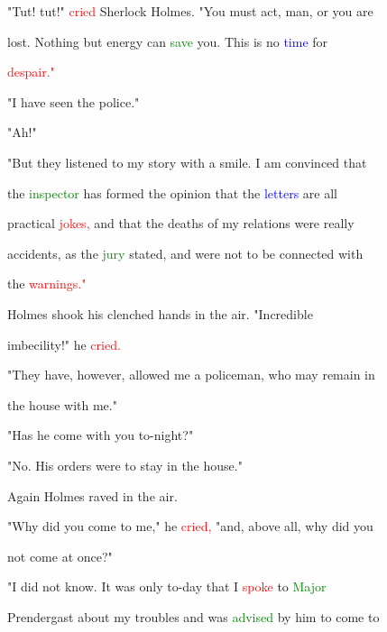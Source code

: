  "Tut! tut!" \textcolor{red}{cried} Sherlock Holmes. "You must act, man, or you are

 \textcolor{BurntOrange}{lost.} Nothing but energy can \textcolor{green}{save} you. This is no \textcolor{blue}{time} for

 \textcolor{red}{despair."}



 "I have seen the \textcolor{BurntOrange}{police."}



 "Ah!"



 "But they listened to my story with a \textcolor{BurntOrange}{smile.} I am \textcolor{BurntOrange}{convinced} that

 the \textcolor{green}{inspector} has formed the opinion that the \textcolor{blue}{letters} are all

 practical \textcolor{red}{jokes,} and that the \textcolor{BurntOrange}{deaths} of my relations were really

 \textcolor{BurntOrange}{accidents,} as the \textcolor{green}{jury} stated, and were not to be connected with

 the \textcolor{red}{warnings."}



 Holmes shook his clenched hands in the air. "Incredible

 imbecility!" he \textcolor{red}{cried.}



 "They have, however, allowed me a \textcolor{BurntOrange}{policeman,} who may remain in

 the house with me."



 "Has he come with you to-night?"



 "No. His orders were to stay in the house."



 Again Holmes \textcolor{BurntOrange}{raved} in the air.



 "Why did you come to me," he \textcolor{red}{cried,} "and, above all, why did you

 not come at once?"



 "I did not know. It was only to-day that I \textcolor{red}{spoke} to \textcolor{green}{Major}

 Prendergast about my troubles and was \textcolor{green}{advised} by him to come to

